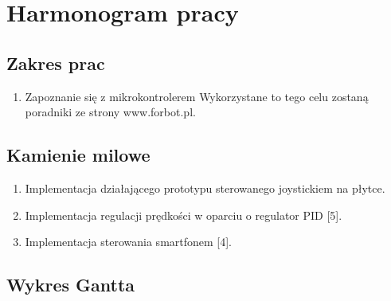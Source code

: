 \documentclass[10pt, a4paper]{article}
\begin{document}
\section{Harmonogram pracy}

\subsection{Zakres prac}
	\begin{enumerate}
		\item Zapoznanie się z mikrokontrolerem
		\newline
		Wykorzystane to tego celu zostaną poradniki ze strony www.forbot.pl. \cite{kurs1, kurs2, kurs3}
	\end{enumerate}
\subsection{Kamienie milowe}
	\begin{enumerate}
		\item Implementacja działającego prototypu sterowanego joystickiem na płytce.
		\item Implementacja regulacji prędkości w oparciu o regulator PID [5].
		\item Implementacja sterowania smartfonem [4].
	\end{enumerate}

\subsection{Wykres Gantta}
\end{document}
